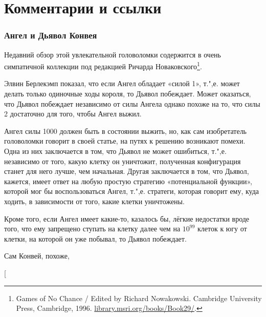 \documentclass[twoside]{book}
\begin{document}

\section*{Комментарии и ссылки}

\subsubsection*{Ангел и Дьявол Конвея}

Недавний обзор этой увлекательной головоломки содержится в очень симпатичной коллекции под редакцией Ричарда Новаковского\footnote{{Games of No Chance} / Edited by Richard Nowakowski. Cambridge University Press, Cambridge, 1996. \href{http://library.msri.org/books/Book29/}{\url{library.msri.org/books/Book29/}}.}. 

Элвин Берлекэмп показал, что если Ангел обладает «силой 1», т.",е. может делать только одиночные ходы короля, то Дьявол побеждает.
Может оказаться, что Дьявол побеждает независимо от силы Ангела\change{; }{,}
однако похоже на то, что силы 2 достаточно для того, чтобы Ангел выжил.

Ангел силы 1000 должен быть в состоянии выжить, но, как сам изобретатель головоломки говорит в своей статье, на путях к решению возникают помехи.
Одна из них заключается в том, что Дьявол не может ошибиться,
т.",е. независимо от того, какую клетку он уничтожит, полученная конфигурация станет для него лучше, чем начальная.
Другая заключается в том, что Дьявол, кажется, имеет ответ на любую простую стратегию «потенциальной функции», которой мог бы воспользоваться Ангел,
т.",е. стратеги, которая говорит ему, куда ходить, в зависимости от того, какие клетки уничтожены. 

Кроме того, если Ангел имеет какие-то, казалось бы, лёгкие недостатки вроде того, что ему запрещено ступать на клетку далее чем на $10^{99}$ клеток к югу от клетки, на которой он уже побывал, то Дьявол побеждает.

Сам Конвей, похоже, 

[\?{Со времени публикации английского оригинала этой книги, задача была независимо решена как минимум 4 раза.
Решения Оддвара Клостера%
\footnote{
\emph{O. Kloster}. 
A solution to the angel problem /\!/
{Theoret. Comput. Sci.} 389 (2007), no. 1--2, 152--161.}
и Андре Мате%
\footnote{
\emph{A. Máthé}. 
The angel of power 2 wins /\!/ 
{Combin. Probab. Comput.} 16 (2007), no. 3, 363–374.}
работают для ангела силы 2.
Решение Брайна Боудича%
\footnote{\emph{B. H. Bowditch}.
  The angel game in the plane /\!/ {Combin. Probab. Comput.} 16 (2007), no. 3, 345--362.}
работает для ангела силы~4.
Решение \?{Питера Гакса}{Или Гакса Питера?}%
\footnote{\emph{G. Peter}. {The angel wins.} \href{https://www.cs.bu.edu/~gacs/papers/angel.pdf}{\url{www.cs.bu.edu/~gacs/}}.}
работает для ангела много большей силы.]}{нет в оригинале}
\end{document}
